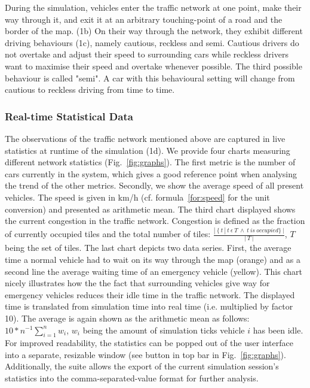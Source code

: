 During the simulation, vehicles enter the traffic network at one point, make their way through it, and exit it at an arbitrary touching-point of a road and the border of the map. (1b) On their way through the network, they exhibit different driving behaviours (1c), namely cautious, reckless and semi. Cautious drivers do not overtake and adjust their speed to surrounding cars while reckless drivers want to maximise their speed and overtake whenever possible. The third possible behaviour is called "semi". A car with this behavioural setting will change from cautious to reckless driving from time to time.

\subsubsection*{Real-time Statistical Data}

The observations of the traffic network mentioned above are captured in live statistics at runtime of the simulation (1d).  We provide four charts measuring different network statistics (Fig.~\ref{fig:graphs}). The first metric is the number of cars currently in the system, which gives a good reference point when analysing the trend of the other metrics. Secondly, we show the average speed of all present vehicles. The speed is given in km/h (cf. formula~\ref{for:speed} for the unit conversion) and presented as arithmetic mean. The third chart displayed shows the current congestion in the traffic network. Congestion is defined as the fraction of currently occupied tiles and the total number of tiles: $\frac{|\:\lbrace \:t\:|\:t\:\epsilon\:T\:\wedge\:t\:is\:occupied\rbrace\:|}{|\:T\:|}$, $T$ being the set of tiles. The last chart depicts two data series. First, the average time a normal vehicle had to wait on its way through the map (orange) and as a second line the average waiting time of an emergency vehicle (yellow). This chart nicely illustrates how the the fact that surrounding vehicles give way for emergency vehicles reduces their idle time in the traffic network. The displayed time is translated from simulation time into real time (i.e. multiplied by factor 10). The average is again shown as the arithmetic mean as follows: $10*n^{-1}\sum\limits_{i=1}^n w_i$, $w_i$ being the amount of simulation ticks vehicle $i$ has been idle. For improved readability, the statistics can be popped out of the user interface into a separate, resizable window (see button in top bar in Fig.~\ref{fig:graphs}). Additionally, the suite allows the export of the current simulation session's statistics into the comma-separated-value format for further analysis.

